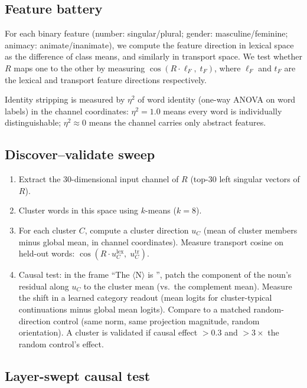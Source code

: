 \documentclass[11pt,a4paper]{article}
\begin{document}
\subsection{Feature battery}
\label{sec:feature-battery}

For each binary feature (number: singular/plural; gender: masculine/feminine; animacy:
animate/inanimate), we compute the feature direction in lexical space as the difference of
class means, and similarly in transport space. We test whether $R$ maps one to the other by
measuring $\cos(R \cdot \ell_F,\; t_F)$, where $\ell_F$ and $t_F$ are the lexical and
transport feature directions respectively.

Identity stripping is measured by $\eta^2$ of word identity (one-way ANOVA on word labels)
in the channel coordinates: $\eta^2 = 1.0$ means every word is individually distinguishable;
$\eta^2 \approx 0$ means the channel carries only abstract features.

\subsection{Discover--validate sweep}
\label{sec:discover-validate}

\begin{enumerate}
\item Extract the 30-dimensional input channel of $R$ (top-30 left singular vectors of $R$).
\item Cluster words in this space using $k$-means ($k=8$).
\item For each cluster $C$, compute a cluster direction $u_C$ (mean of cluster members minus
global mean, in channel coordinates). Measure transport cosine on held-out words:
$\cos(R \cdot u_C^\mathrm{lex},\; u_C^\mathrm{tr})$.
\item Causal test: in the frame ``The $\langle$N$\rangle$ is \underline{\hspace{1cm}}'',
patch the component of the noun's residual along $u_C$ to the cluster mean (vs.\ the
complement mean). Measure the shift in a learned category readout (mean logits for
cluster-typical continuations minus global mean logits). Compare to a matched random-direction
control (same norm, same projection magnitude, random orientation). A cluster is validated if
causal effect $> 0.3$ and $> 3\times$ the random control's effect.
\end{enumerate}

\subsection{Layer-swept causal test}
\label{sec:layer-sweep}
\end{document}
